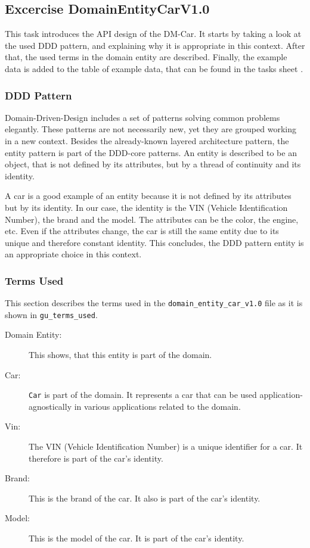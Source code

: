 \subsection{Excercise DomainEntityCarV1.0}
\label{subsec:domain_entity_car_v1.0}
This task introduces the API design of the DM-Car.
It starts by taking a look at the used DDD pattern, and explaining why it is appropriate in this context.
After that, the used terms in the domain entity are described.
Finally, the example data is added to the table of example data, that can be found in the tasks sheet \cite{CM-T-DMC}.

\subsubsection*{DDD Pattern}
\label{subsubsec:ddd_pattern}
Domain-Driven-Design includes a set of patterns solving common problems elegantly.
These patterns are not necessarily new, yet they are grouped working in a new context.
Besides the already-known layered architecture pattern, the entity pattern is part of the DDD-core patterns.
An entity is described to be an object, that is not defined by its attributes, but by a thread of continuity and its identity.

A car is a good example of an entity because it is not defined by its attributes but by its identity.
In our case, the identity is the VIN (Vehicle Identification Number), the brand and the model.
The attributes can be the color, the engine, etc.
Even if the attributes change, the car is still the same entity due to its unique and therefore constant identity.
This concludes, the DDD pattern entity is an appropriate choice in this context.

\subsubsection*{Terms Used}
This section describes the terms used in the \texttt{domain\_entity\_car\_v1.0} file as it is shown in \texttt{gu\_terms\_used}.
\begin{description}
    \item[Domain Entity:] This shows, that this entity is part of the domain.
    \item[Car:] \texttt{Car} is part of the domain.
                It represents a car that can be used application-agnostically in various applications related to the domain.
    \item[Vin:] The VIN (Vehicle Identification Number) is a unique identifier for a car.
                It therefore is part of the car's identity.
    \item[Brand:] This is the brand of the car.
                It also is part of the car's identity.
    \item[Model:] This is the model of the car.
                It is part of the car's identity.
\end{description}

